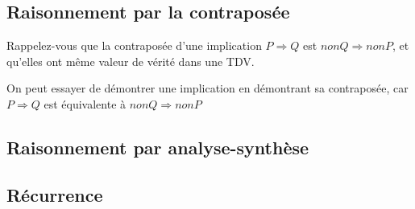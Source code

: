 \documentclass{article}
\begin{document}
\begin{tcolorbox}[colback=green!5!white,colframe=green!75!black,title=Point méthode 4.10]


\end{tcolorbox}


\begin{tcolorbox}[colback=cyan!5!white,colframe=cyan!75!black,title=Exercice]


\end{tcolorbox}

\subsection{Raisonnement par la contraposée}

Rappelez-vous que la contraposée d'une implication $P \Rightarrow Q$ est $non Q \Rightarrow non P$, et qu'elles ont même valeur de vérité dans une TDV.

\begin{tcolorbox}[colback=green!5!white,colframe=green!75!black,title=Point méthode 4.11]

On peut essayer de démontrer une implication en démontrant sa contraposée, car $P \Rightarrow Q$ est équivalente à $non Q \Rightarrow non P$

\end{tcolorbox}


\begin{tcolorbox}[colback=cyan!5!white,colframe=cyan!75!black,title=Exercice]


\end{tcolorbox}

\subsection{Raisonnement par analyse-synthèse}

\begin{tcolorbox}[colback=green!5!white,colframe=green!75!black,title=Point méthode 4.12]


\end{tcolorbox}


\begin{tcolorbox}[colback=cyan!5!white,colframe=cyan!75!black,title=Exercice]


\end{tcolorbox}

\subsection{Récurrence}
\end{document}
